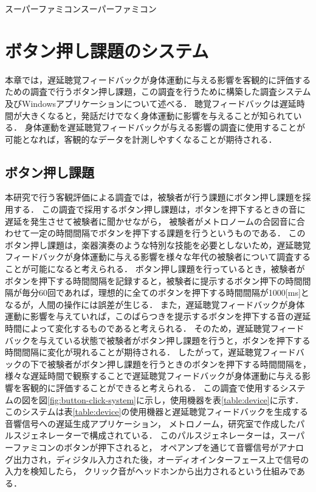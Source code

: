 スーパーファミコンスーパーファミコン\chapter{ボタン押し課題のシステム}
本章では，遅延聴覚フィードバックが身体運動に与える影響を客観的に評価するための調査で行うボタン押し課題，この調査を行うために構築した調査システム及びWindowsアプリケーションについて述べる．
聴覚フィードバックは遅延時間が大きくなると，発話だけでなく身体運動に影響を与えることが知られている\cite{timing-music}\cite{shimada-DAF}．
身体運動を遅延聴覚フィードバックが与える影響の調査に使用することが可能となれば，客観的なデータを計測しやすくなることが期待される．

\section{ボタン押し課題}
本研究で行う客観評価による調査では，被験者が行う課題にボタン押し課題を採用する．
この調査で採用するボタン押し課題は，ボタンを押下するときの音に遅延を発生させて被験者に聞かせながら，
被験者がメトロノームの合図音に合わせて一定の時間間隔でボタンを押下する課題を行うというものである．
このボタン押し課題は，楽器演奏のような特別な技能を必要としないため，遅延聴覚フィードバックが身体運動に与える影響を様々な年代の被験者について調査することが可能になると考えられる．
ボタン押し課題を行っているとき，被験者がボタンを押下する時間間隔を記録すると，被験者に提示するボタン押下の時間間隔が毎分60回であれば，理想的に全てのボタンを押下する時間間隔が1000[ms]となるが，人間の操作には誤差が生じる．
また，遅延聴覚フィードバックが身体運動に影響を与えていれば，このばらつきを提示するボタンを押下する音の遅延時間によって変化するものであると考えられる．
そのため，遅延聴覚フィードバックを与えている状態で被験者がボタン押し課題を行うと，ボタンを押下する時間間隔に変化が現れることが期待される．
したがって，遅延聴覚フィードバックの下で被験者がボタン押し課題を行うときのボタンを押下する時間間隔を，
様々な遅延時間で観察することで遅延聴覚フィードバックが身体運動に与える影響を客観的に評価することができると考えられる．
この調査で使用するシステムの図を図\ref{fig:button-click-system}に示し，使用機器を表\ref{table:device}に示す．
このシステムは表\ref{table:device}の使用機器と遅延聴覚フィードバックを生成する音響信号への遅延生成アプリケーション，
メトロノーム，研究室で作成したパルスジェネレーターで構成されている．
このパルスジェネレーターは，スーパーファミコンのボタンが押下されると，
オペアンプを通じて音響信号がアナログ出力され，ディジタル入力された後，オーディオインターフェース上で信号の入力を検知したら，
クリック音がヘッドホンから出力されるという仕組みである．
